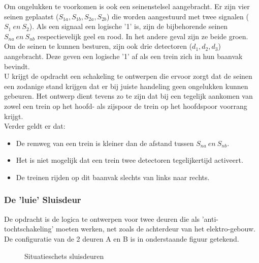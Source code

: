 Om ongelukken te voorkomen is ook een seinenstelsel aangebracht.
Er zijn vier seinen geplaatst ($S_{1a}, S_{1b}, S_{2a}, S_{2b}$)
 die worden 
aangestuurd met twee signalen ($S_{1}\ en\ S_{2}$). Als een signaal 
een logi\-sche '1' is, zijn de bijbehorende seinen $S_{na}\ en\ S_{nb}$
respectievelijk geel en rood. In het andere geval zijn ze beide
groen.\\
Om de seinen te kunnen besturen, zijn ook drie detectoren
($d_{1},d_{2},d_{3}$)
aangebracht. Deze geven een logische '1' af als een trein zich in hun
baanvak bevindt.\\
U krijgt de opdracht een schakeling te ontwerpen die ervoor zorgt
dat de seinen een zodanige stand krijgen dat er bij juiste handeling
geen ongelukken kunnen gebeuren. Het ontwerp dient tevens zo te zijn 
dat bij een tegelijk aankomen van zowel een trein op het hoofd- als
zijspoor de trein op het hoofdspoor voorrang krijgt.\\
Verder geldt er dat:
\begin{itemize}
\item
De remweg van een trein is kleiner dan de afstand tussen $S_{na}\ en\ S_{nb}$.
\item
Het is niet mogelijk dat een trein twee detectoren tegelijkertijd activeert.
\item
De treinen rijden op dit baanvak slechts van links naar rechts.
\end{itemize}

\clearpage

\subsubsection{De 'luie' Sluisdeur}
De opdracht is de logica te ontwerpen voor twee deuren 
die als 'anti-tochtschakeling' 
moeten werken, net zoals de achterdeur van het elektro-gebouw. 
De configuratie van de 2 deuren A en B is in onderstaande figuur getekend.

\begin{figure}[bth]
\centerline{}
\caption{Situatieschets sluisdeuren}
\end{figure}

